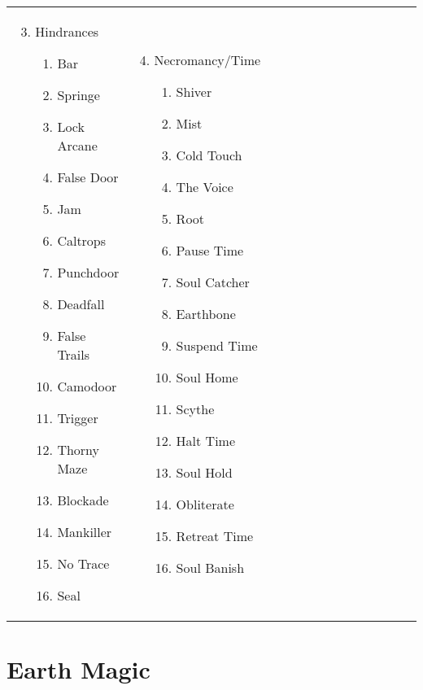 \begin{tabular}{@{} p{0.25\linewidth} p{0.25\linewidth} p{0.25\linewidth} p{0.25\linewidth}}
\begin{enumerate}
	\setcounter{enumi}{2}
	\item Hindrances
	\begin{enumerate}
		\item Bar
		\item Springe
		\item Lock Arcane
		\item False Door
		\item Jam
		\item Caltrops
		\item Punchdoor
		\item Deadfall
		\item False Trails
		\item Camodoor
		\item Trigger
		\item Thorny Maze
		\item Blockade
		\item Mankiller
		\item No Trace
		\item Seal
	\end{enumerate}
\end{enumerate} &
\begin{enumerate}
	\setcounter{enumi}{3}
	\item Necromancy/Time
	\begin{enumerate}
		\item Shiver
		\item Mist
		\item Cold Touch
		\item The Voice
		\item Root
		\item Pause Time
		\item Soul Catcher
		\item Earthbone
		\item Suspend Time
		\item Soul Home
		\item Scythe
		\item Halt Time
		\item Soul Hold
		\item Obliterate
		\item Retreat Time
		\item Soul Banish
	\end{enumerate}
\end{enumerate} \\
\end{tabular}
\pagebreak
\section{Earth Magic}

